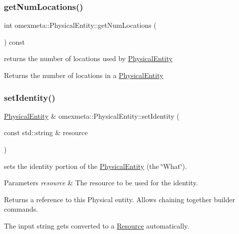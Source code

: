 \subsubsection{\texorpdfstring{get\+Num\+Locations()}{getNumLocations()}}
{\footnotesize\ttfamily int omexmeta\+::\+Physical\+Entity\+::get\+Num\+Locations (\begin{DoxyParamCaption}{ }\end{DoxyParamCaption}) const}



returns the number of locations used by \hyperlink{classomexmeta_1_1PhysicalEntity}{Physical\+Entity} 

\begin{DoxyReturn}{Returns}
the number of locations in a \hyperlink{classomexmeta_1_1PhysicalEntity}{Physical\+Entity} 
\end{DoxyReturn}
\mbox{\label{classomexmeta_1_1PhysicalEntity_a4d4c3ee9572b19e44e79a44f18f1ac31}} 
\subsubsection{\texorpdfstring{set\+Identity()}{setIdentity()}}
{\footnotesize\ttfamily \hyperlink{classomexmeta_1_1PhysicalEntity}{Physical\+Entity} \& omexmeta\+::\+Physical\+Entity\+::set\+Identity (\begin{DoxyParamCaption}\item[{const std\+::string \&}]{resource }\end{DoxyParamCaption})}



sets the identity portion of the \hyperlink{classomexmeta_1_1PhysicalEntity}{Physical\+Entity} (the \char`\"{}\+What\char`\"{}). 


\begin{DoxyParams}{Parameters}
{\em resource} & The resource to be used for the identity. \\
\hline
\end{DoxyParams}
\begin{DoxyReturn}{Returns}
a reference to this Physical entity. Allows chaining together builder commands.
\end{DoxyReturn}
The input string gets converted to a \hyperlink{classomexmeta_1_1Resource}{Resource} automatically.

